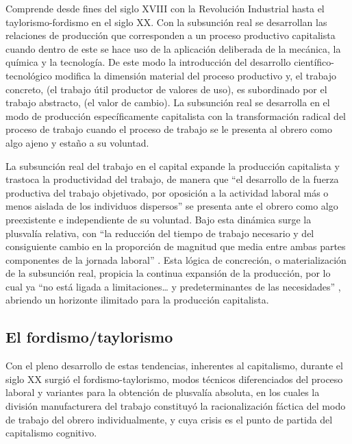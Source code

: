 \documentclass[
  spanish,
  11pt,
  a4paper,
]{scrbook}
\begin{document}
Comprende desde fines del siglo XVIII con la Revolución Industrial hasta
el taylorismo-fordismo en el siglo XX. Con la subsunción real se
desarrollan las relaciones de producción que corresponden a un proceso
productivo capitalista cuando dentro de este se hace uso de la
aplicación deliberada de la mecánica, la química y la tecnología. De
este modo la introducción del desarrollo científico-tecnológico modifica
la dimensión material del proceso productivo y, el trabajo concreto, (el
trabajo útil productor de valores de uso), es subordinado por el trabajo
abstracto, (el valor de cambio). La subsunción real se desarrolla en el
modo de producción específicamente capitalista con la transformación
radical del proceso de trabajo \autocite[72]{Marx2009inedito} cuando el
proceso de trabajo se le presenta al obrero como algo ajeno y estaño a
su voluntad.

La subsunción real del trabajo en el capital expande la producción
capitalista y trastoca la productividad del trabajo, de manera que ``el
desarrollo de la fuerza productiva del trabajo objetivado, por oposición
a la actividad laboral más o menos aislada de los individuos dispersos''
\autocite[59]{Marx2009inedito} se presenta ante el obrero como algo
preexistente e independiente de su voluntad. Bajo esta dinámica surge la
plusvalía relativa, con ``la reducción del tiempo de trabajo necesario y
del consiguiente cambio en la proporción de magnitud que media entre
ambas partes componentes de la jornada laboral''
\autocite[383]{Marx2009tomo1}. Esta lógica de concreción, o
materialización de la subsunción real, propicia la continua expansión de
la producción, por lo cual ya ``no está ligada a limitaciones\ldots{} y
predeterminantes de las necesidades'' \autocite[76]{Marx2009tomo1},
abriendo un horizonte ilimitado para la producción capitalista.

\subsection*{El fordismo/taylorismo}\label{el-fordismotaylorismo}

Con el pleno desarrollo de estas tendencias, inherentes al capitalismo,
durante el siglo XX surgió el fordismo-taylorismo, modos técnicos
diferenciados del proceso laboral y variantes para la obtención de
plusvalía absoluta, en los cuales la división manufacturera del trabajo
constituyó la racionalización fáctica del modo de trabajo del obrero
individualmente, y cuya crisis es el punto de partida del capitalismo
cognitivo.
\end{document}

